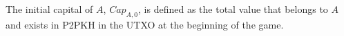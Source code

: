 {}
\begin{definition}[Capital]
   The initial capital of $A$, $Cap_{A, 0}$, is defined as the total value that belongs to $A$ and exists in P2PKH in
   the UTXO at the beginning of the game.
\end{definition}
